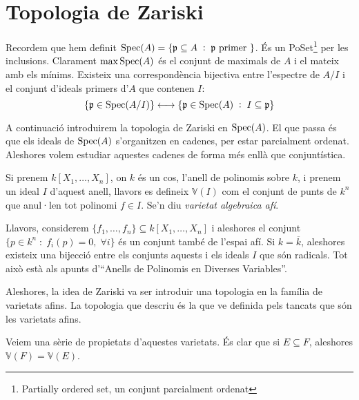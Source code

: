 \documentclass[../../../main.tex]{subfiles}
\begin{document}
\section{Topologia de Zariski}


Recordem que hem definit $\mathrm{Spec}(A) = \{\mathfrak{p}\subseteq A\;:\;\mathfrak{p} \text{ primer }\}$. És un PoSet\footnote{Partially ordered set, un conjunt parcialment ordenat} per les inclusions. Clarament $\max\mathrm{Spec}(A)$ és el conjunt de maximals de $A$ i el mateix amb els mínims. Existeix una correspondència bijectiva entre l'espectre de $A/I$ i el conjunt d'ideals primers d'$A$ que contenen $I$:
\begin{equation}
    \label{eq:correspondenciaBijectivaSpec}
    \{\mathfrak{p}\in\mathrm{Spec}(A/I)\}\longleftrightarrow \{\mathfrak{p}\in\mathrm{Spec}(A)\;:\;I\subseteq\mathfrak{p}\}
\end{equation}

A continuació introduirem la topologia de Zariski en $\mathrm{Spec}(A)$. El que passa és que els ideals de $\mathrm{Spec}(A)$ s'organitzen en cadenes, per estar parcialment ordenat. Aleshores volem estudiar aquestes cadenes de forma més enllà que conjuntística. 

\begin{defi}
\label{def:varietatAlgebraicaAfi} Si prenem $k[X_1,\ldots,X_n]$, on $k$ és un cos, l'anell de polinomis sobre $k$, i prenem un ideal $I$ d'aquest anell, llavors es defineix $\mathbb{V}(I)$ com el conjunt de punts de $k^n$ que anul·len tot polinomi $f\in I$. Se'n diu \textit{varietat algebraica afí}.
\end{defi}

Llavors, considerem $\{f_1,\ldots,f_n\}\subseteq k[X_1,\ldots,X_n]$ i aleshores el conjunt $\{p\in k^n\;:\;f_i(p) = 0,\;\forall i\}$ és un conjunt també de l'espai afí. Si $k = \overline{k}$, aleshores existeix una bijecció entre els conjunts aquests i els ideals $I$ que són radicals. Tot això està als apunts d'``Anells de Polinomis en Diverses Variables''.

Aleshores, la idea de Zariski va ser introduir una topologia en la família de varietats afins. La topologia que descriu és la que ve definida pels tancats que són les varietats afins.

Veiem una sèrie de propietats d'aquestes varietats. És clar que si $E\subseteq F$, aleshores $\mathbb{V}(F) = \mathbb{V}(E)$.
\end{document}
